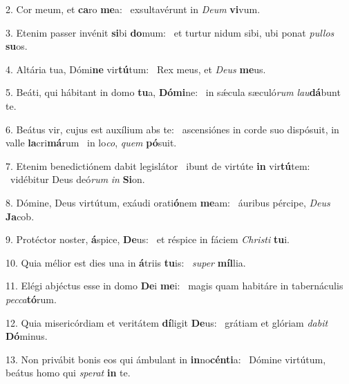 2. Cor meum, et \textbf{ca}ro \textbf{me}a: \ast\  exsultavérunt in \textit{De}\textit{um} \textbf{vi}vum.\

3. Etenim passer invénit \textbf{si}bi \textbf{do}mum: \ast\  et turtur nidum sibi, ubi ponat \textit{pul}\textit{los} \textbf{su}os.\

4. Altária tua, Dómi\textbf{ne} vir\textbf{tú}tum: \ast\  Rex meus, et \textit{De}\textit{us} \textbf{me}us.\

5. Beáti, qui hábitant in domo \textbf{tu}a, \textbf{Dó}\textbf{mi}ne: \ast\  in sǽcula sæculó\textit{rum} \textit{lau}\textbf{dá}bunt te.\

6. Beátus vir, cujus est auxílium abs te: \dag\  ascensiónes in corde suo dispósuit, in valle \textbf{la}cri\textbf{má}rum \ast\  in lo\textit{co}, \textit{quem} \textbf{pó}suit.\

7. Etenim benedictiónem dabit legislátor \dag\  ibunt de virtúte \textbf{in} vir\textbf{tú}tem: \ast\  vidébitur Deus deó\textit{rum} \textit{in} \textbf{Si}on.\

8. Dómine, Deus virtútum, exáudi orati\textbf{ó}nem \textbf{me}am: \ast\  áuribus pércipe, \textit{De}\textit{us} \textbf{Ja}cob.\

9. Protéctor noster, \textbf{á}spice, \textbf{De}us: \ast\  et réspice in fáciem \textit{Chris}\textit{ti} \textbf{tu}i.\

10. Quia mélior est dies una in \textbf{á}triis \textbf{tu}is: \ast\  \textit{su}\textit{per} \textbf{míl}lia.\

11. Elégi abjéctus esse in domo \textbf{De}i \textbf{me}i: \ast\  magis quam habitáre in tabernáculis \textit{pec}\textit{ca}\textbf{tó}rum.\

12. Quia misericórdiam et veritátem \textbf{dí}ligit \textbf{De}us: \ast\  grátiam et glóriam \textit{da}\textit{bit} \textbf{Dó}minus.\

13. Non privábit bonis eos qui ámbulant in \textbf{in}no\textbf{cén}\textbf{ti}a: \ast\  Dómine virtútum, beátus homo qui \textit{spe}\textit{rat} \textbf{in} te.\

